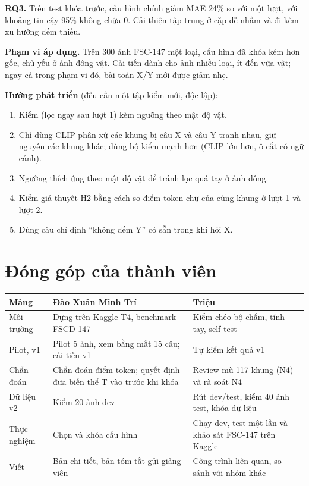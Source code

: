 \documentclass[12pt,a4paper]{article}
\begin{document}
\textbf{RQ3.} Trên test khóa trước, cấu hình chính giảm MAE 24\% so với một lượt, với khoảng tin cậy 95\% không chứa 0. Cải thiện tập trung ở cặp dễ nhầm và đi kèm xu hướng đếm thiếu.

\textbf{Phạm vi áp dụng.} Trên 300 ảnh FSC-147 một loại, cấu hình đã khóa kém hơn \cgdpp{} gốc, chủ yếu ở ảnh đông vật. Cải tiến dành cho ảnh nhiều loại, ít đến vừa vật; ngay cả trong phạm vi đó, bài toán X/Y mới được giảm nhẹ.

\textbf{Hướng phát triển} (đều cần một tập kiểm mới, độc lập):
\begin{enumerate}
\item Kiểm \Csix{} (lọc ngay sau lượt 1) kèm ngưỡng theo mật độ vật.
\item Chỉ dùng CLIP phân xử các khung bị câu X và câu Y tranh nhau, giữ nguyên các khung khác; dùng bộ kiểm mạnh hơn (CLIP lớn hơn, ô cắt có ngữ cảnh).
\item Ngưỡng thích ứng theo mật độ vật để tránh lọc quá tay ở ảnh đông.
\item Kiểm giả thuyết H2 bằng cách so điểm token chữ của cùng khung ở lượt 1 và lượt 2.
\item Dùng câu chỉ định ``không đếm Y'' có sẵn trong \cgdpp{} khi hỏi X.
\end{enumerate}

\section*{Đóng góp của thành viên}
\begin{table}[H]
\centering
\small
\begin{tabularx}{\textwidth}{@{}l L L@{}}
\toprule
Mảng & Đào Xuân Minh Trí & Triệu\\
\midrule
Môi trường & Dựng \cgdpp{} trên Kaggle T4, benchmark FSCD-147 & Kiểm chéo bộ chấm, tính tay, self-test\\
Pilot, v1 & Pilot 5 ảnh, xem bằng mắt 15 câu; cải tiến v1 & Tự kiểm kết quả v1\\
Chẩn đoán & Chẩn đoán điểm token; quyết định đưa biến thể T vào trước khi khóa & Review mù 117 khung (N4) và rà soát N4\\
Dữ liệu v2 & Kiểm 20 ảnh dev & Rút dev/test, kiểm 40 ảnh test, khóa dữ liệu\\
Thực nghiệm & Chọn và khóa cấu hình & Chạy dev, test một lần và khảo sát FSC-147 trên Kaggle\\
Viết & Bản chi tiết, bản tóm tắt gửi giảng viên & Công trình liên quan, so sánh với nhóm khác\\
\bottomrule
\end{tabularx}
\end{table}
\noindent{}
\end{document}
